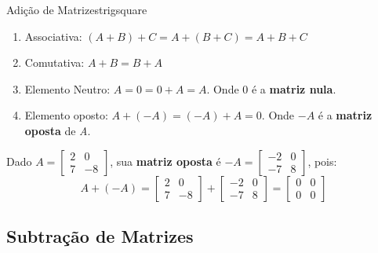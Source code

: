 \begin{proposition}{Adição de Matrizes}{trigsquare}
  \begin{enumerate}
    \item Associativa: $(A + B) + C = A + (B + C) = A + B + C$
    \item Comutativa: $A + B = B + A$
    \item Elemento Neutro: $A = 0 = 0 + A = A$. Onde $0$ é a \textbf{matriz nula}.
    \item Elemento oposto: $A + (-A) = (-A) + A = 0$. Onde $-A$ é a \textbf{matriz oposta} de \textit{A}.
  \end{enumerate}
\end{proposition}

\begin{example}
  Dado $A = \begin{bmatrix}
    2 & 0 \\
    7 & -8 
  \end{bmatrix}$,
  sua \textbf{matriz oposta} é $-A = \begin{bmatrix}
    -2 & 0 \\
    -7 & 8
  \end{bmatrix}$, pois:
  \begin{equation*}
    A + (-A) = \begin{bmatrix}
      2 & 0 \\
      7 & -8
    \end{bmatrix} + \begin{bmatrix}
      -2 & 0 \\
      -7 & 8 
    \end{bmatrix} = \begin{bmatrix}
      0 & 0 \\
      0 & 0
    \end{bmatrix}
  \end{equation*}
\end{example}

\subsection{Subtração de Matrizes}

